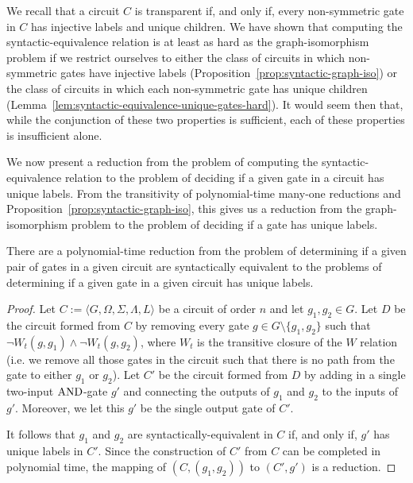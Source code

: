\documentclass[../paper.tex]{subfiles}
\begin{document}
We recall that a circuit $C$ is transparent if, and only if, every non-symmetric
gate in $C$ has injective labels and unique children. We have shown that
computing the syntactic-equivalence relation is at least as hard as the
graph-isomorphism problem if we restrict ourselves to either the class of
circuits in which non-symmetric gates have injective labels
(Proposition~\ref{prop:syntactic-graph-iso}) or the class of circuits in which
each non-symmetric gate has unique children
(Lemma~\ref{lem:syntactic-equivalence-unique-gates-hard}). It would seem then
that, while the conjunction of these two properties is sufficient, each of these
properties is insufficient alone.

We now present a reduction from the problem of computing the
syntactic-equivalence relation to the problem of deciding if a given gate in a
circuit has unique labels. From the transitivity of polynomial-time many-one
reductions and Proposition~\ref{prop:syntactic-graph-iso}, this gives us a
reduction from the graph-isomorphism problem to the problem of deciding if a
gate has unique labels.

\begin{lem}
  There are a polynomial-time reduction from the problem of determining if a
  given pair of gates in a given circuit are syntactically equivalent to the
  problems of determining if a given gate in a given circuit has unique labels.
  \label{lem:syntactically-equivalent-unique-labels}
\end{lem}

\begin{proof}
  Let $C := \langle G, \Omega, \Sigma, \Lambda, L \rangle$ be a circuit of order
  $n$ and let $g_1, g_2 \in G$. Let $D$ be the circuit formed from $C$ by
  removing every gate $g \in G \setminus\{g_1, g_2\}$ such that $\neg W_t(g,
  g_1) \land \neg W_t(g, g_2)$, where $W_t$ is the transitive closure of the $W$
  relation (i.e. we remove all those gates in the circuit such that there is no
  path from the gate to either $g_1$ or $g_2$). Let $C'$ be the circuit formed
  from $D$ by adding in a single two-input $\text{\upshape AND}$-gate $g'$ and connecting the
  outputs of $g_1$ and $g_2$ to the inputs of $g'$. Moreover, we let this $g'$
  be the single output gate of $C'$.

  It follows that $g_1$ and $g_2$ are syntactically-equivalent in $C$ if, and
  only if, $g'$ has unique labels in $C'$. Since the construction of $C'$ from
  $C$ can be completed in polynomial time, the mapping of $(C, (g_1, g_2))$ to
  $(C', g')$ is a reduction.
\end{proof}
\end{document}

